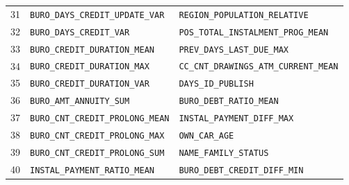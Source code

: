 \documentclass[final,5p,twocolumn]{elsarticle}
\begin{document}
\begin{table}[htbp]
\begin{threeparttable}
\begin{tabular}{@{}rL{80mm}L{80mm}@{}}
31 & \texttt{BURO\_\allowbreak DAYS\_\allowbreak CREDIT\_\allowbreak UPDATE\_\allowbreak VAR} & \texttt{REGION\_\allowbreak POPULATION\_\allowbreak RELATIVE} \\
32 & \texttt{BURO\_\allowbreak DAYS\_\allowbreak CREDIT\_\allowbreak VAR} & \texttt{POS\_\allowbreak TOTAL\_\allowbreak INSTALMENT\_\allowbreak PROG\_\allowbreak MEAN} \\
33 & \texttt{BURO\_\allowbreak CREDIT\_\allowbreak DURATION\_\allowbreak MEAN} & \texttt{PREV\_\allowbreak DAYS\_\allowbreak LAST\_\allowbreak DUE\_\allowbreak MAX} \\
34 & \texttt{BURO\_\allowbreak CREDIT\_\allowbreak DURATION\_\allowbreak MAX} & \texttt{CC\_\allowbreak CNT\_\allowbreak DRAWINGS\_\allowbreak ATM\_\allowbreak CURRENT\_\allowbreak MEAN} \\
35 & \texttt{BURO\_\allowbreak CREDIT\_\allowbreak DURATION\_\allowbreak VAR} & \texttt{DAYS\_\allowbreak ID\_\allowbreak PUBLISH} \\
36 & \texttt{BURO\_\allowbreak AMT\_\allowbreak ANNUITY\_\allowbreak SUM} & \texttt{BURO\_\allowbreak DEBT\_\allowbreak RATIO\_\allowbreak MEAN} \\
37 & \texttt{BURO\_\allowbreak CNT\_\allowbreak CREDIT\_\allowbreak PROLONG\_\allowbreak MEAN} & \texttt{INSTAL\_\allowbreak PAYMENT\_\allowbreak DIFF\_\allowbreak MAX} \\
38 & \texttt{BURO\_\allowbreak CNT\_\allowbreak CREDIT\_\allowbreak PROLONG\_\allowbreak MAX} & \texttt{OWN\_\allowbreak CAR\_\allowbreak AGE} \\
39 & \texttt{BURO\_\allowbreak CNT\_\allowbreak CREDIT\_\allowbreak PROLONG\_\allowbreak SUM} & \texttt{NAME\_\allowbreak FAMILY\_\allowbreak STATUS} \\
40 & \texttt{INSTAL\_\allowbreak PAYMENT\_\allowbreak RATIO\_\allowbreak MEAN} & \texttt{BURO\_\allowbreak DEBT\_\allowbreak CREDIT\_\allowbreak DIFF\_\allowbreak MIN} \\
\bottomrule
\end{tabular}
\end{threeparttable}
\end{table}
\end{document}
